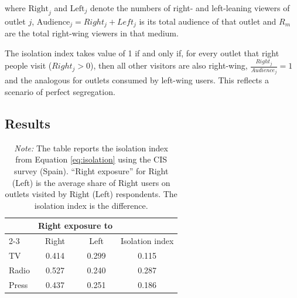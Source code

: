 \documentclass[12pt]{article}
\begin{document}
%
where $\mathrm{Right}_j$ and $\mathrm{Left}_j$ denote the numbers of right- and left-leaning viewers of outlet $j$, $\text{Audience}_j=Right_j + Left_j$ is its total audience of that outlet and $R_m$ are the total right-wing viewers in that medium. 

The isolation index takes value of 1 if and only if, for every outlet that right people visit ($Right_j>0$), then all other visitors are also right-wing, $\frac{Right_j}{Audience_j}=1$ and the analogous for outlets consumed by left-wing users. This reflects a scenario of perfect segregation. 




	\subsection{Results}
\FloatBarrier	
	
	\begin{table}[H]
		\caption{Ideological Segregation by Medium (CIS Survey)}
		\label{tab:isolation_table}
		
		\centering
		\begin{tabular}{lccc}
			\hline
			& \multicolumn{2}{c}{Right exposure to } & \\
			\cline{2-3}
			& Right & Left & Isolation index \\
			\hline
			TV    & 0.414 & 0.299 & 0.115 \\
			Radio & 0.527 & 0.240 & 0.287 \\
			Press & 0.437 & 0.251 & 0.186 \\
			\hline
		\end{tabular}
		

		
		\caption*{\small  \textit{Note:} The table reports the isolation index from Equation \eqref{eq:isolation}  using the CIS survey (Spain). “Right exposure” for Right (Left) is the average share of Right users on outlets visited by Right (Left) respondents. The isolation index is the difference.}
		
	\end{table}
	
	
	
\end{document}
